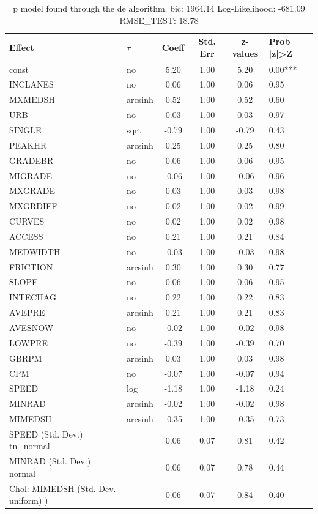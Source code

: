 \begin{table}
	\caption{p model found through the de algorithm. bic: 1964.14 Log-Likelihood: -681.09 RMSE_TEST: 18.78}
	\begin{center}
		\begin{tabular}{|l|l|c|c|c|l|}
			\hline
			Effect & $\tau$ & Coeff & Std. Err & z-values & Prob |z|>Z \\
			\hline
			const & no & 5.20 & 1.00 & 5.20 & 0.00*** \\
			\hline
			INCLANES & no & 0.06 & 1.00 & 0.06 & 0.95 \\
			\hline
			MXMEDSH & arcsinh & 0.52 & 1.00 & 0.52 & 0.60 \\
			\hline
			URB & no & 0.03 & 1.00 & 0.03 & 0.97 \\
			\hline
			SINGLE & sqrt & -0.79 & 1.00 & -0.79 & 0.43 \\
			\hline
			PEAKHR & arcsinh & 0.25 & 1.00 & 0.25 & 0.80 \\
			\hline
			GRADEBR & no & 0.06 & 1.00 & 0.06 & 0.95 \\
			\hline
			MIGRADE & no & -0.06 & 1.00 & -0.06 & 0.96 \\
			\hline
			MXGRADE & no & 0.03 & 1.00 & 0.03 & 0.98 \\
			\hline
			MXGRDIFF & no & 0.02 & 1.00 & 0.02 & 0.99 \\
			\hline
			CURVES & no & 0.02 & 1.00 & 0.02 & 0.98 \\
			\hline
			ACCESS & no & 0.21 & 1.00 & 0.21 & 0.84 \\
			\hline
			MEDWIDTH & no & -0.03 & 1.00 & -0.03 & 0.98 \\
			\hline
			FRICTION & arcsinh & 0.30 & 1.00 & 0.30 & 0.77 \\
			\hline
			SLOPE & no & 0.06 & 1.00 & 0.06 & 0.95 \\
			\hline
			INTECHAG & no & 0.22 & 1.00 & 0.22 & 0.83 \\
			\hline
			AVEPRE & arcsinh & 0.21 & 1.00 & 0.21 & 0.83 \\
			\hline
			AVESNOW & no & -0.02 & 1.00 & -0.02 & 0.98 \\
			\hline
			LOWPRE & no & -0.39 & 1.00 & -0.39 & 0.70 \\
			\hline
			GBRPM & arcsinh & 0.03 & 1.00 & 0.03 & 0.98 \\
			\hline
			CPM & no & -0.07 & 1.00 & -0.07 & 0.94 \\
			\hline
			SPEED & log & -1.18 & 1.00 & -1.18 & 0.24 \\
			\hline
			MINRAD & arcsinh & -0.02 & 1.00 & -0.02 & 0.98 \\
			\hline
			MIMEDSH & arcsinh & -0.35 & 1.00 & -0.35 & 0.73 \\
			\hline
			SPEED (Std. Dev.) tn_normal &  & 0.06 & 0.07 & 0.81 & 0.42 \\
			\hline
			MINRAD (Std. Dev.) normal &  & 0.06 & 0.07 & 0.78 & 0.44 \\
			\hline
			 Chol: MIMEDSH (Std. Dev. uniform) ) &  & 0.06 & 0.07 & 0.84 & 0.40 \\
			\hline
		\end{tabular}
	\end{center}
\end{table}